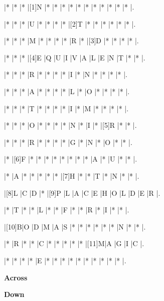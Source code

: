\begin{Puzzle}{15}{16}

|*    |*    |*    |[1]N |*    |*    |*    |*    |*    |*    |*    |*    |*    |*    |*    |.

|*    |*    |*    |U    |*    |*    |*    |*    |[2]T |*    |*    |*    |*    |*    |*    |.

|*    |*    |*    |M    |*    |*    |*    |*    |R    |*    |[3]D |*    |*    |*    |*    |.

|*    |*    |*    |[4]E |Q    |U    |I    |V    |A    |L    |E    |N    |T    |*    |*    |.

|*    |*    |*    |R    |*    |*    |*    |*    |I    |*    |N    |*    |*    |*    |*    |.

|*    |*    |*    |A    |*    |*    |*    |*    |L    |*    |O    |*    |*    |*    |*    |.

|*    |*    |*    |T    |*    |*    |*    |*    |I    |*    |M    |*    |*    |*    |*    |.

|*    |*    |*    |O    |*    |*    |*    |*    |N    |*    |I    |*    |[5]R |*    |*    |.

|*    |*    |*    |R    |*    |*    |*    |*    |G    |*    |N    |*    |O    |*    |*    |.

|*    |[6]F |*    |*    |*    |*    |*    |*    |*    |*    |A    |*    |U    |*    |*    |.

|*    |A    |*    |*    |*    |*    |*    |[7]H |*    |*    |T    |*    |N    |*    |*    |.

|[8]L |C    |D    |*    |[9]P |L    |A    |C    |E    |H    |O    |L    |D    |E    |R    |.

|*    |T    |*    |*    |L    |*    |*    |F    |*    |*    |R    |*    |I    |*    |*    |.

|[10]B|O    |D    |M    |A    |S    |*    |*    |*    |*    |*    |*    |N    |*    |*    |.

|*    |R    |*    |*    |C    |*    |*    |*    |*    |*    |[11]M|A    |G    |I    |C    |.

|*    |*    |*    |*    |E    |*    |*    |*    |*    |*    |*    |*    |*    |*    |*    |.

\end{Puzzle}



\begin{PuzzleClues}{\textbf{Across}}






\end{PuzzleClues}

\begin{PuzzleClues}{\textbf{Down}}








\end{PuzzleClues}